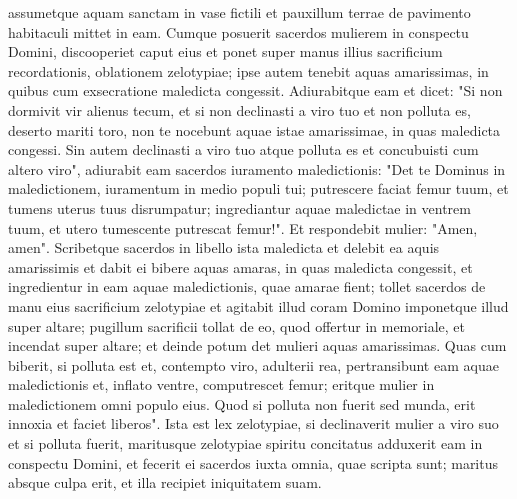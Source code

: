 \begin{biblechapter}
\verse assumetque aquam sanctam in vase fictili et pauxillum terrae de pavimento habitaculi mittet in eam. 
\verse Cumque posuerit sacerdos mulierem in conspectu Domini, discooperiet caput eius et ponet super manus illius sacrificium recordationis, oblationem zelotypiae; ipse autem tenebit aquas amarissimas, in quibus cum exsecratione maledicta congessit. 
\verse Adiurabitque eam et dicet: "Si non dormivit vir alienus tecum, et si non declinasti a viro tuo et non polluta es, deserto mariti toro, non te nocebunt aquae istae amarissimae, in quas maledicta congessi.  
\verse Sin autem declinasti a viro tuo atque polluta es et concubuisti cum altero viro", 
\verse adiurabit eam sacerdos iuramento maledictionis: "Det te Dominus in maledictionem, iuramentum in medio populi tui; putrescere faciat femur tuum, et tumens uterus tuus disrumpatur; 
\verse ingrediantur aquae maledictae in ventrem tuum, et utero tumescente putrescat femur!". Et respondebit mulier: "Amen, amen". 
\verse Scribetque sacerdos in libello ista maledicta et delebit ea aquis amarissimis 
\verse et dabit ei bibere aquas amaras, in quas maledicta congessit, et ingredientur in eam aquae maledictionis, quae amarae fient; 
\verse tollet sacerdos de manu eius sacrificium zelotypiae et agitabit illud coram Domino imponetque illud super altare; 
\verse pugillum sacrificii tollat de eo, quod offertur in memoriale, et incendat super altare; et deinde potum det mulieri aquas amarissimas. 
\verse Quas cum biberit, si polluta est et, contempto viro, adulterii rea, pertransibunt eam aquae maledictionis et, inflato ventre, computrescet femur; eritque mulier in maledictionem omni populo eius. 
\verse Quod si polluta non fuerit sed munda, erit innoxia et faciet liberos". 
\verse Ista est lex zelotypiae, si declinaverit mulier a viro suo et si polluta fuerit, 
\verse maritusque zelotypiae spiritu concitatus adduxerit eam in conspectu Domini, et fecerit ei sacerdos iuxta omnia, quae scripta sunt; 
\verse maritus absque culpa erit, et illa recipiet iniquitatem suam. 
\end{biblechapter}


